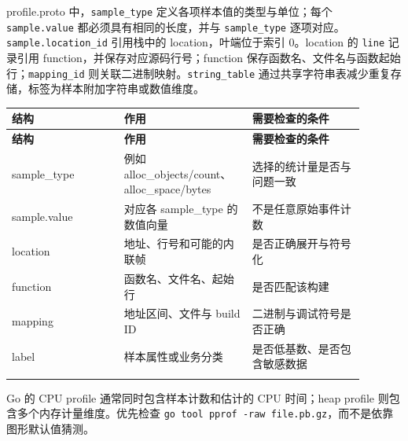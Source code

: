 \documentclass[UTF8,fontset=fandol,openany,11pt]{ctexbook}
\begin{document}
profile.proto 中，\texttt{sample\_\allowbreak{}type} 定义各项样本值的类型与单位；每个 \texttt{sample.\allowbreak{}value} 都必须具有相同的长度，并与 \texttt{sample\_\allowbreak{}type} 逐项对应。\texttt{sample.\allowbreak{}location\_\allowbreak{}id} 引用栈中的 location，叶端位于索引 0。location 的 \texttt{line} 记录引用 function，并保存对应源码行号；function 保存函数名、文件名与函数起始行；\texttt{mapping\_\allowbreak{}id} 则关联二进制映射。\texttt{string\_\allowbreak{}table} 通过共享字符串表减少重复存储，标签为样本附加字符串或数值维度。

\begingroup\small\setlength{\tabcolsep}{4pt}
\begin{longtable}{>{\raggedright\arraybackslash}p{0.298\linewidth}>{\raggedright\arraybackslash}p{0.298\linewidth}>{\raggedright\arraybackslash}p{0.298\linewidth}}
\toprule
\textbf{结构} & \textbf{作用} & \textbf{需要检查的条件} \\
\midrule
\endfirsthead
\toprule
\textbf{结构} & \textbf{作用} & \textbf{需要检查的条件} \\
\midrule
\endhead
sample\_type & 例如 alloc\_objects/count、alloc\_space/bytes & 选择的统计量是否与问题一致 \\
\addlinespace[3pt]
sample.value & 对应各 sample\_type 的数值向量 & 不是任意原始事件计数 \\
\addlinespace[3pt]
location & 地址、行号和可能的内联帧 & 是否正确展开与符号化 \\
\addlinespace[3pt]
function & 函数名、文件名、起始行 & 是否匹配该构建 \\
\addlinespace[3pt]
mapping & 地址区间、文件与 build ID & 二进制与调试符号是否正确 \\
\addlinespace[3pt]
label & 样本属性或业务分类 & 是否低基数、是否包含敏感数据 \\
\addlinespace[3pt]
\bottomrule
\end{longtable}
\endgroup
Go 的 CPU profile 通常同时包含样本计数和估计的 CPU 时间；heap profile 则包含多个内存计量维度。优先检查 \texttt{go tool pprof -\allowbreak{}raw file.\allowbreak{}pb.\allowbreak{}gz}，而不是依靠图形默认值猜测。
\end{document}
